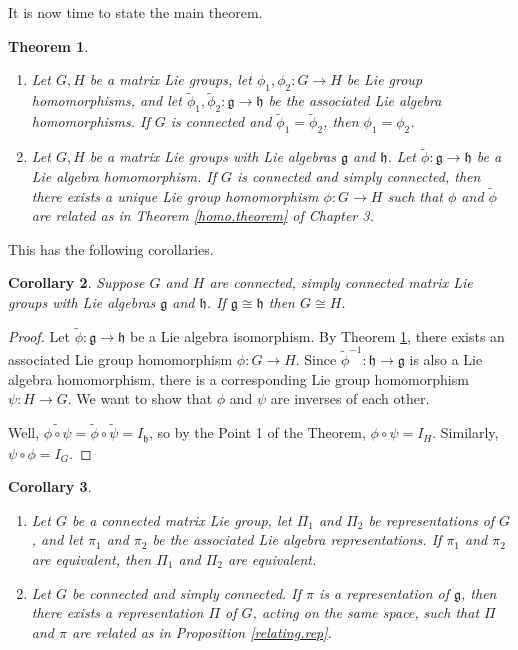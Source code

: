 \documentclass{amsbook}
\let \frak = \mathfrak
\theoremstyle{plain}
\newtheorem{theorem}{Theorem}
\newtheorem{corollary}[theorem]{Corollary}
\numberwithin{equation}{chapter}
\numberwithin{theorem}{chapter}
\begin{document}
It is now time to state the main theorem.

\begin{theorem}
\label{exp.rep}

\begin{enumerate}
\item  Let $G,H$ be a matrix Lie groups, let $\phi_{1},\phi_{2}:G\rightarrow
H$ be Lie group homomorphisms, and let $\widetilde{\phi}_{1},\widetilde{\phi
}_{2}:\frak{g}\rightarrow\frak{h}$ be the associated Lie algebra
homomorphisms. If $G$ is \textit{connected} and $\widetilde{\phi}%
_{1}=\widetilde{\phi}_{2}$, then $\phi_{1}=\phi_{2}$.

\item  Let $G,H$ be a matrix Lie groups with Lie algebras $\frak{g}$ and
$\frak{h}$. Let $\widetilde{\phi}:\frak{g\rightarrow h}$ be a Lie algebra
homomorphism. If $G$ is \textit{connected} and \textit{simply}
\textit{connected}, then there exists a unique Lie group homomorphism
$\phi:G\rightarrow H$ such that $\phi$ and $\widetilde{\phi}$ are related as
in Theorem \ref{homo.theorem} of Chapter 3.
\end{enumerate}
\end{theorem}

This has the following corollaries.

\begin{corollary}
Suppose $G$ and $H$ are connected, simply connected matrix Lie groups with Lie
algebras $\frak{g}$ and $\frak{h}$. If $\frak{g}\cong\frak{h}$ then $G\cong H$.
\end{corollary}

\begin{proof}
Let $\widetilde{\phi}:\frak{g}\rightarrow\frak{h}$ be a Lie algebra
isomorphism. By Theorem \ref{exp.rep}, there exists an associated Lie group
homomorphism $\phi:G\rightarrow H$. Since $\widetilde{\phi}^{-1}%
:\frak{h}\rightarrow\frak{g}$ is also a Lie algebra homomorphism, there is a
corresponding Lie group homomorphism $\psi:H\rightarrow G$. We want to show
that $\phi$ and $\psi$ are inverses of each other.

Well, $\widetilde{\phi\circ\psi}=\widetilde{\phi}\circ\widetilde{\psi
}=I_{\frak{h}}$, so by the Point 1 of the Theorem, $\phi\circ\psi=I_{H}$.
Similarly, $\psi\circ\phi=I_{G}$.
\end{proof}

\begin{corollary}
\begin{enumerate}
\item \label{sc.reps}Let $G$ be a \textit{connected} matrix Lie group, let
$\Pi_{1}$ and $\Pi_{2}$ be representations of $G$, and let $\pi_{1}$ and
$\pi_{2}$ be the associated Lie algebra representations. If $\pi_{1}$ and
$\pi_{2}$ are equivalent, then $\Pi_{1}$ and $\Pi_{2}$ are equivalent.

\item  Let $G$ be \textit{connected }and \textit{simply connected}. If $\pi$
is a representation of $\frak{g}$, then there exists a representation $\Pi$ of
$G$, acting on the same space, such that $\Pi$ and $\pi$ are related as in
Proposition \ref{relating.rep}.
\end{enumerate}
\end{corollary}
\end{document}
